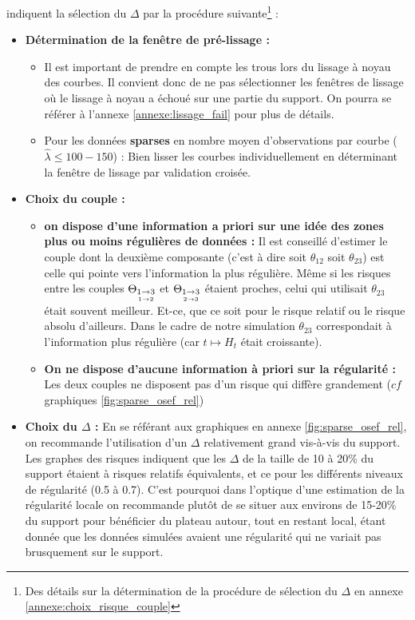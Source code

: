 indiquent la sélection du $\Delta$ par la procédure suivante\footnote{Des détails sur la détermination de la procédure de sélection du $\Delta$ en annexe \ref{annexe:choix_risque_couple}} :

\begin{itemize}
	\item \textbf{Détermination de la fenêtre de pré-lissage :}
	\begin{itemize}

		\item Il est important de prendre en compte les \og trous \fg lors du lissage à noyau des courbes. Il convient donc de ne pas sélectionner les fenêtres de lissage où le lissage à noyau a échoué sur une partie du support. On pourra se référer à l'annexe \ref{annexe:lissage_fail} pour plus de détails.

		\item Pour les données \textbf{sparses} en nombre moyen d'observations par courbe ($\widehat \lambda \leq  100-150$) : Bien lisser les courbes individuellement en déterminant la fenêtre de lissage par validation croisée.
	\end{itemize}


	\bigskip

	\item \textbf{Choix du couple :}

	\begin{itemize}
		\item \textbf{on dispose d'une information a priori sur une idée des zones plus ou moins régulières de données :} Il est conseillé d'estimer le couple dont la deuxième composante (c'est à dire soit $\theta_{12}$ soit $\theta_{23}$) est celle qui pointe vers l'information la plus régulière. Même si les risques entre les couples $\Theta_{\underset{1 \rightarrow 2}{1 \rightarrow 3}}$ et $\Theta_{\underset{2 \rightarrow 3}{1 \rightarrow 3}}$ étaient proches, celui qui utilisait $\theta_{23}$ était souvent meilleur. Et-ce, que ce soit pour le risque relatif ou le risque absolu d'ailleurs. Dans le cadre de notre simulation $\theta_{23}$ correspondait à l'information plus régulière (car $t \mapsto H_t$ était croissante).
		\item \textbf{On ne dispose d'aucune information à priori sur la régularité :} Les deux couples ne disposent pas d'un risque qui diffère grandement ($cf$ graphiques \ref{fig:sparse_osef_rel})
	\end{itemize}

\bigskip

\item \textbf{Choix du $\Delta$ : } En se référant aux graphiques en annexe \ref{fig:sparse_osef_rel}, on recommande l'utilisation d'un $\Delta$ relativement grand vis-à-vis du support. Les graphes des risques indiquent que les $\Delta$ de la taille de 10 à 20\% du support étaient à risques relatifs équivalents, et ce pour les différents niveaux de régularité (0.5 à 0.7). C'est pourquoi dans l'optique d'une estimation de la régularité \og locale \fg on recommande plutôt de se situer aux environs de 15-20\% du support pour bénéficier du plateau autour, tout en restant local, étant donnée que les données simulées avaient une régularité qui ne variait pas brusquement sur le support.


\end{itemize}

